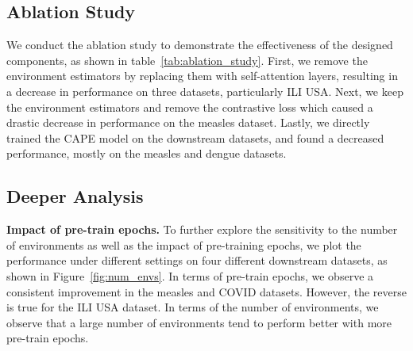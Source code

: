 \subsection{Ablation Study}
We conduct the ablation study to demonstrate the effectiveness of the designed components, as shown in table~\ref{tab:ablation_study}. First, we remove the environment estimators by replacing them with self-attention layers, resulting in a decrease in performance on three datasets, particularly ILI USA. Next, we keep the environment estimators and remove the contrastive loss which caused a drastic decrease in performance on the measles dataset. Lastly, we directly trained the CAPE model on the downstream datasets, and found a decreased performance, mostly on the measles and dengue datasets.

\subsection{Deeper Analysis}
\textbf{Impact of pre-train epochs.} To further explore the sensitivity to the number of environments as well as the impact of pre-training epochs, we plot the performance under different settings on four different downstream datasets, as shown in Figure~\ref{fig:num_envs}. In terms of pre-train epochs, we observe a consistent improvement in the measles and COVID datasets. However, the reverse is true for the ILI USA dataset. In terms of the number of environments, we observe that a large number of environments tend to perform better with more pre-train epochs.




